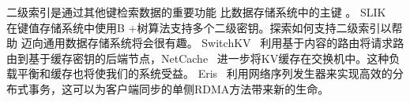 二级索引是通过其他键检索数据的重要功能
比数据存储系统中的主键 \cite {escriva2012hyperdex,kejriwal2016slik}。 SLIK~ \cite {kejriwal2016slik}在键值存储系统中使用B +树算法支持多个二级密钥。探索如何支持二级索引以帮助 \oursys{} 迈向通用数据存储系统将会很有趣。 SwitchKV~ \cite {li2016fast}利用基于内容的路由将请求路由到基于缓存密钥的后端节点，NetCache~ \cite {netcache-sosp17}进一步将KV缓存在交换机中。这种负载平衡和缓存也将使我们的系统受益。
Eris~ \cite {eris}利用网络序列发生器来实现高效的分布式事务，这可以为客户端同步的单侧RDMA方法带来新的生命。










